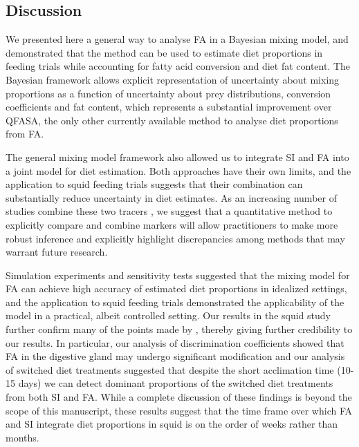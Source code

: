 \documentclass{article}%
\begin{document}
\begin{spacing}{1.9}
\begin{flushleft}
\section{Discussion}

We presented here a general way to analyse FA in a Bayesian mixing
model, and demonstrated that the method can be used to estimate diet proportions
in feeding trials while accounting for fatty acid conversion and diet
fat content. The Bayesian framework allows explicit representation of
uncertainty about mixing proportions as a function of uncertainty
about prey distributions, conversion coefficients and fat content,
which represents a substantial improvement over QFASA, the only other
currently available method to analyse diet proportions from FA.

The general mixing model framework also allowed us to integrate SI and
FA into a joint model for diet estimation. Both approaches have their
own limits, and the application to squid feeding trials suggests that their combination can substantially reduce uncertainty in diet estimates. As an increasing number of studies combine
these two tracers \citep{tucker_convergence_2008,guest_evidence_2008,guest_trophic_2009,stowasser_experimental_2006,van_der_bank_dietary_2011,jaschinski_carbon_2008},
we suggest that a quantitative method to explicitly compare and combine
markers will allow practitioners to make more robust inference and
explicitly highlight discrepancies among methods that may warrant
future research.

Simulation experiments and sensitivity tests suggested that the mixing model for FA can
achieve high accuracy of estimated diet proportions in idealized
settings, and the application to squid feeding trials demonstrated the
applicability of the model in a practical, albeit controlled setting. Our results in the
squid study further confirm many of the points made by
\citet{stowasser_experimental_2006}, thereby giving further credibility to our
results. In particular, our analysis of discrimination coefficients
showed that FA in the digestive gland may undergo significant
modification and our analysis of switched diet treatments suggested
that despite the short acclimation time (10-15 days) we can detect
dominant proportions of the switched diet treatments from both SI and
FA. While a complete discussion of these findings is beyond the scope
of this manuscript, these results suggest that the time frame over
which FA and SI integrate diet proportions in squid is on the order of
weeks rather than months.


\end{flushleft}
\end{spacing}
\end{document}
